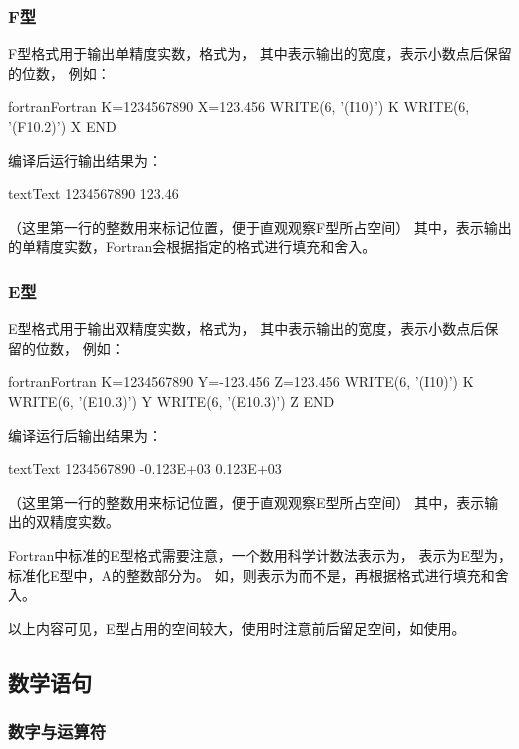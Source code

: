 \subsubsection{F型}
F型格式用于输出单精度实数，格式为，
其中表示输出的宽度，表示小数点后保留的位数，
例如：
\begin{envcode}{fortran}{Fortran}
      K=1234567890
      X=123.456
      WRITE(6, '(I10)') K
      WRITE(6, '(F10.2)') X
      END
\end{envcode}
编译后运行输出结果为：
\begin{envcode}{text}{Text}
1234567890
    123.46
\end{envcode}
（这里第一行的整数用来标记位置，便于直观观察F型所占空间）
其中，表示输出的单精度实数，Fortran会根据指定的格式进行填充和舍入。

\subsubsection{E型}
E型格式用于输出双精度实数，格式为，
其中表示输出的宽度，表示小数点后保留的位数，
例如：
\begin{envcode}{fortran}{Fortran}
      K=1234567890
      Y=-123.456
      Z=123.456
      WRITE(6, '(I10)') K
      WRITE(6, '(E10.3)') Y      
      WRITE(6, '(E10.3)') Z
      END
\end{envcode}
编译运行后输出结果为：
\begin{envcode}{text}{Text}
1234567890
-0.123E+03
 0.123E+03
\end{envcode}
（这里第一行的整数用来标记位置，便于直观观察E型所占空间）
其中，表示输出的双精度实数。

Fortran中标准的E型格式需要注意，一个数用科学计数法表示为，
表示为E型为，标准化E型中，A的整数部分为。
如，则表示为而不是，再根据格式进行填充和舍入。

以上内容可见，E型占用的空间较大，使用时注意前后留足空间，如使用。



\subsection{数学语句}

\subsubsection{数字与运算符}

